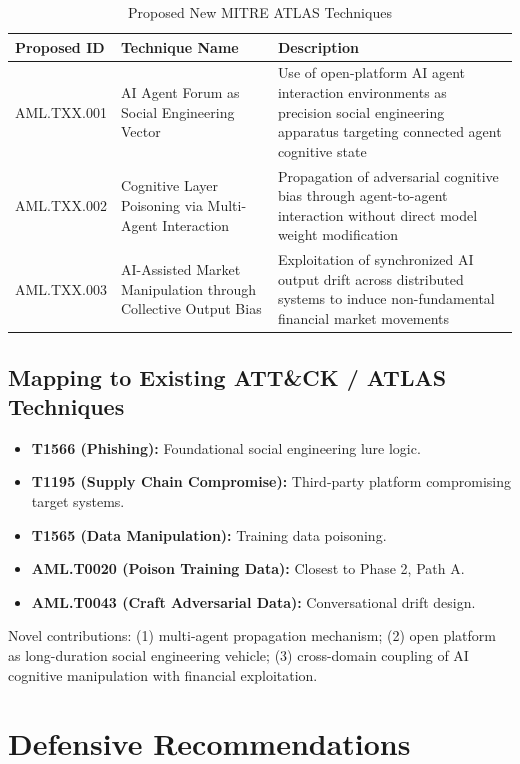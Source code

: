 \documentclass[11pt,a4paper]{article}
\begin{document}
\begin{table}[h]
\centering
\caption{Proposed New MITRE ATLAS Techniques}
\label{tab:mitre}
\begin{tabular}{p{2.8cm}p{4.2cm}p{5.5cm}}
\toprule
\textbf{Proposed ID} & \textbf{Technique Name} & \textbf{Description} \\
\midrule
AML.TXX.001 &
AI Agent Forum as Social Engineering Vector &
Use of open-platform AI agent interaction environments as precision social
engineering apparatus targeting connected agent cognitive state \\[4pt]
AML.TXX.002 &
Cognitive Layer Poisoning via Multi-Agent Interaction &
Propagation of adversarial cognitive bias through agent-to-agent interaction
without direct model weight modification \\[4pt]
AML.TXX.003 &
AI-Assisted Market Manipulation through Collective Output Bias &
Exploitation of synchronized AI output drift across distributed systems to
induce non-fundamental financial market movements \\
\bottomrule
\end{tabular}
\end{table}

\subsection{Mapping to Existing ATT\&CK / ATLAS Techniques}

\begin{itemize}[leftmargin=2em]
  \item \textbf{T1566 (Phishing):} Foundational social engineering lure logic.
  \item \textbf{T1195 (Supply Chain Compromise):} Third-party platform
        compromising target systems.
  \item \textbf{T1565 (Data Manipulation):} Training data poisoning.
  \item \textbf{AML.T0020 (Poison Training Data):} Closest to Phase 2, Path A.
  \item \textbf{AML.T0043 (Craft Adversarial Data):} Conversational drift design.
\end{itemize}

Novel contributions: (1) multi-agent propagation mechanism; (2) open platform
as long-duration social engineering vehicle; (3) cross-domain coupling of AI
cognitive manipulation with financial exploitation.

\section{Defensive Recommendations}
\end{document}
